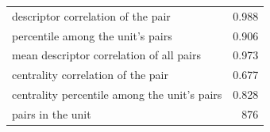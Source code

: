 \begin{tabular}{lr}
\hline
descriptor correlation of the pair & 0.988 \\
percentile among the unit's pairs & 0.906 \\
mean descriptor correlation of all pairs & 0.973 \\
centrality correlation of the pair & 0.677 \\
centrality percentile among the unit's pairs & 0.828 \\
pairs in the unit & 876 \\
\hline
\end{tabular}
